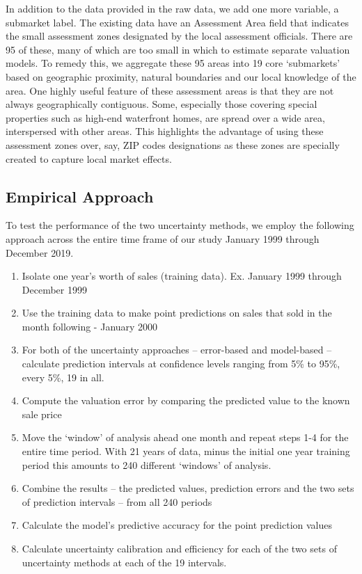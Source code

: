 \documentclass[colTwo]{format}
\theoremstyle{definition}
\begin{document}
In addition to the data provided in the raw data, we add one more variable, a submarket label.  The existing data have an Assessment Area field that indicates the small assessment zones designated by the local assessment officials.  There are 95 of these, many of which are too small in which to estimate separate valuation models.  To remedy this, we aggregate these 95 areas into 19 core ‘submarkets’ based on geographic proximity, natural boundaries and our local knowledge of the area. One highly useful feature of these assessment areas is that they are not always geographically contiguous.  Some, especially those covering special properties such as high-end waterfront homes, are spread over a wide area, interspersed with other areas.  This highlights the advantage of using these assessment zones over, say, ZIP codes designations as these zones are specially created to capture local market effects.

\subsection{Empirical Approach}

To test the performance of the two uncertainty methods, we employ the following approach across the entire time frame of our study January 1999 through December 2019. 

\begin{enumerate}
\item Isolate one year’s worth of sales (training data). Ex. January 1999 through December 1999
\item Use the training data to make point predictions on sales that sold in the month following - January 2000
\item For both of the uncertainty approaches -- error-based and model-based -- calculate prediction intervals at confidence levels ranging from 5\% to 95\%, every 5\%, 19 in all. 
\item Compute the valuation error by comparing the predicted value to the known sale price
\item Move the ‘window’ of analysis ahead one month and repeat steps 1-4 for the entire time period.  With 21 years of data, minus the initial one year training period this amounts to 240 different ‘windows’ of analysis.
\item Combine the results -- the predicted values, prediction errors and the two sets of prediction intervals -- from all 240 periods
\item Calculate the model’s predictive accuracy for the point prediction values
\item Calculate uncertainty calibration and efficiency for each of the two sets of uncertainty methods at each of the 19 intervals.
\end{enumerate}
\end{document}
